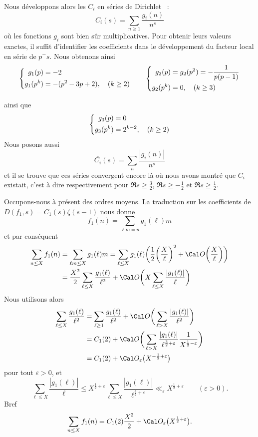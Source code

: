 \documentclass[12pt,a4paper,twoside]{article}
\let\ve=\varepsilon
\begin{document}
Nous d\'eveloppons alors les $C_i$ en s\'eries de Dirichlet ~:
$$
C_i(s)=\sum_{n\ge1}\frac{g_i(n)}{n^s}
$$
o\`u les fonctions $g_i$ sont bien s\^ur multiplicatives. Pour obtenir
leurs valeurs exactes, il suffit d'identifier les coefficients dans le
d\'eveloppement du facteur local en s\'erie de $p^-s$. Nous obtenons
ainsi
$$
\left\{
\aligned
g_1(p)&=-2\\
g_1(p^k)&=-(p^2-3p+2), \quad(k\ge2)
\endaligned
\right.
\qquad
\left\{
\aligned
g_2(p)&=g_2(p^2)=-\frac{1}{p(p-1)}\\
g_2(p^k)&=0, \quad(k\ge3)
\endaligned
\right.
$$

ainsi que
$$
\left\{
\aligned
g_3(p)&=0\\
g_3(p^k)&=2^{k-2}, \quad(k\ge2)
\endaligned
\right.
$$
Nous posons aussi
$$
\overline{C_i}(s)=\sum_n\frac{|g_i(n)|}{n^{s}}
$$
et il se trouve que ces s\'eries convergent encore l\`a o\`u nous
avons montr\'e que $C_i$ existait, c'est \`a dire respectivement pour
$\Re s\ge\tfrac32$, $\Re s\ge-\tfrac12$ et $\Re s\ge\tfrac12$.

\bigskip
Occupons-nous \`a pr\'esent des ordres moyens. La traduction sur les
coefficients de $D(f_1,s)=C_1(s)\zeta(s-1)$ nous donne
$$
f_1(n)=\sum_{\ell m=n}g_1(\ell)m
$$
et par cons\'equent
$$
\aligned
\sum_{n\le X}f_1(n)
&=\sum_{\ell m\le X}g_1(\ell)m
=\sum_{\ell\le X}g_1(\ell)
\bigg(\frac12\bigg(\frac X\ell\bigg)^2
+\Cal O\bigg(\frac X\ell\bigg)\bigg)
\\&=\frac{X^2}{2}
\sum_{\ell\le X}\frac{g_1(\ell)}{\ell^2}
+\Cal O\bigg(X \sum_{\ell\le X}\frac{|g_1(\ell)|}{\ell}\bigg)
\endaligned
$$
Nous utilisons alors
\let\ve=\varepsilon
$$
\aligned
\sum_{\ell\le X}\frac{g_1(\ell)}{\ell^2}
&=
\sum_{\ell\ge 1}\frac{g_1(\ell)}{\ell^2}
+\Cal O\bigg(
\sum_{\ell> X}\frac{|g_1(\ell)|}{\ell^2}
\bigg)
\\&=C_1(2)+\Cal O\bigg(
\sum_{\ell> X}\frac{|g_1(\ell)|}{\ell^{\frac32+\ve}}\frac{1}{X^{\frac12-\ve}}
\bigg)
\\&=C_1(2)+\Cal O_\ve\big(X^{-\frac12+\ve}\big)
\endaligned
$$
pour tout $\ve>0$,
et
$$
\sum_{\ell\le X}\frac{|g_1(\ell)|}{\ell}
\le
X^{\frac12+\ve}\sum_{\ell\le X}\frac{|g_1(\ell)|}{\ell^{\frac32+\ve}}
\ll_\ve X^{\frac12+\ve}\qquad(\ve>0).
$$
Bref
$$
\sum_{n\le X}f_1(n)=C_1(2)\frac{X^2}{2}+\Cal O_\ve\big(X^{\frac12+\ve}\big).
$$
\end{document}
